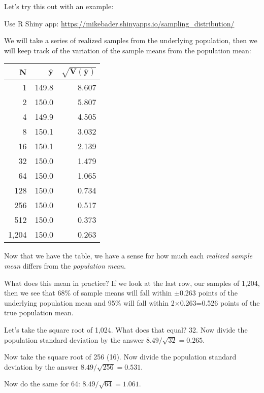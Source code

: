 \documentclass[11pt]{lecturenotes}
\begin{document}
Let's try this out with an example:

Use R Shiny app: \url{https://mikebader.shinyapps.io/sampling_distribution/}

We will take a series of realized samples from the underlying population, then we will keep track of the variation of the sample means from the population mean: 

\begin{table}[!h]
\begin{center}
\begin{tabular}{rrr}
{N} & $\mathbf{\overline{y}}$ & $\mathbf{\sqrt{V(\overline{y})}}$ \\ \toprule
1 & 149.8 & 8.607 \\
2 & 150.0 & 5.807 \\
4 & 149.9 & 4.505 \\
8 & 150.1 & 3.032 \\
16 & 150.1 & 2.139 \\
32 & 150.0 & 1.479 \\
64 & 150.0 & 1.065 \\
128 & 150.0 & 0.734 \\
256 & 150.0 & 0.517 \\
512 & 150.0 & 0.373 \\
1,204 & 150.0 & 0.263 \\ \bottomrule
\end{tabular}
\end{center}
\end{table}

Now that we have the table, we have a sense for how much each \emph{realized sample mean} differs from the \emph{population mean}. 

What does this mean in practice? If we look at the last row, our samples of 1,204, then we see that 68\% of sample means will fall within $\pm$0.263 points of the underlying population mean and 95\% will fall within 2$\times$0.263=0.526 points of the true population mean. 

Let's take the square root of 1,024. What does that equal? 32. Now divide the population standard deviation by the answer ${8.49}/{\sqrt{32}}=0.265$.

Now take the square root of 256 (16). Now divide the population standard deviation by the answer ${8.49}/{\sqrt{256}}=0.531$.

Now do the same for 64: ${8.49}/{\sqrt{64}}=1.061$.
\end{document}
